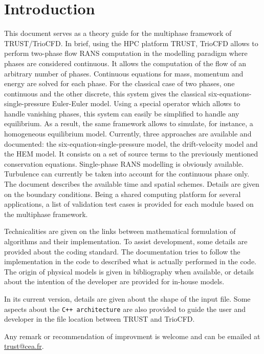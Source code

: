 \chapter*{Introduction}

This document serves as a theory guide for the multiphase framework of TRUST/TrioCFD. In brief, using the HPC platform TRUST, TrioCFD allows to perform two-phase flow RANS computation in the modelling paradigm where phases are considered continuous. It allows the computation of the flow of an arbitrary number of phases. Continuous equations for mass, momentum and energy are solved for each phase. For the classical case of two phases, one continuous and the other discrete, this system gives the classical six-equations-single-pressure Euler-Euler model. Using a special operator which allows to handle vanishing phases, this system can easily be simplified to handle any equilibrium. As a result, the same framework allows to simulate, for instance, a homogeneous equilibrium model. Currently, three approaches are available and documented: the six-equation-single-pressure model, the drift-velocity model and the HEM model. It consists on a set of source terms to the previously mentioned conservation equations. Single-phase RANS modelling is obviously available. Turbulence can currently be taken into account for the continuous phase only. The document describes the available time and spatial schemes. Details are given on the boundary conditions. Being a shared computing platform for several applications, a list of validation test cases is provided for each module based on the multiphase framework.

Technicalities are given on the links between mathematical formulation of algorithms and their implementation. To assist development, some details are provided about the coding standard. The documentation tries to follow the implementation in the code to described what is actually performed in the code. The origin of physical models is given in bibliography when available, or details about the intention of the developer are provided for in-house models.

In its current version, details are given about the shape of the input file. Some aspects about the \texttt{C++ architecture} are also provided to guide the user and developer in the file location between TRUST and TrioCFD.

Any remark or recommendation of improvment is welcome and can be emailed at \href{mailto:trust@cea.fr}{trust@cea.fr}.
